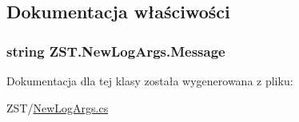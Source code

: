 \subsection{Dokumentacja właściwości}
\hypertarget{class_z_s_t_1_1_new_log_args_aac5883e40720dabf36c5aff38900ae6b}{}
\subsubsection[{Message}]{\setlength{\rightskip}{0pt plus 5cm}string Z\+S\+T.\+New\+Log\+Args.\+Message\hspace{0.3cm}{\ttfamily [get]}}\label{class_z_s_t_1_1_new_log_args_aac5883e40720dabf36c5aff38900ae6b}


Dokumentacja dla tej klasy została wygenerowana z pliku\+:\begin{DoxyCompactItemize}
\item 
Z\+S\+T/\hyperlink{_new_log_args_8cs}{New\+Log\+Args.\+cs}\end{DoxyCompactItemize}
